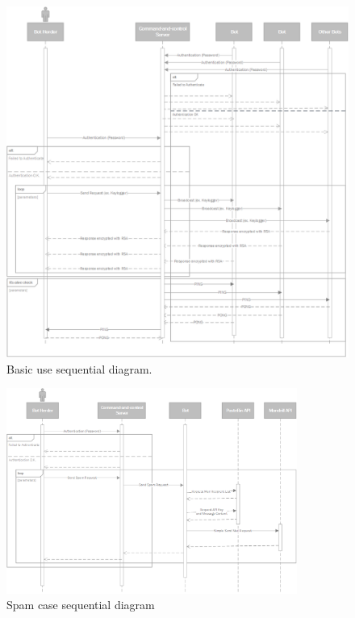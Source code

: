 \documentclass[]{article}
\begin{document}
\begin{figure}
	\centering
	\includegraphics[width=1\textwidth]{sequencial_diagram.png}
	\caption{Basic use sequential diagram.}
	\label{fig:sequential}
\end{figure}


\begin{figure}
	\centering
	\includegraphics[width=0.85\textwidth]{sequencial_spam_diagram.png}
	\caption{Spam case sequential diagram}
	\label{fig:spam}
\end{figure}
\end{document}
